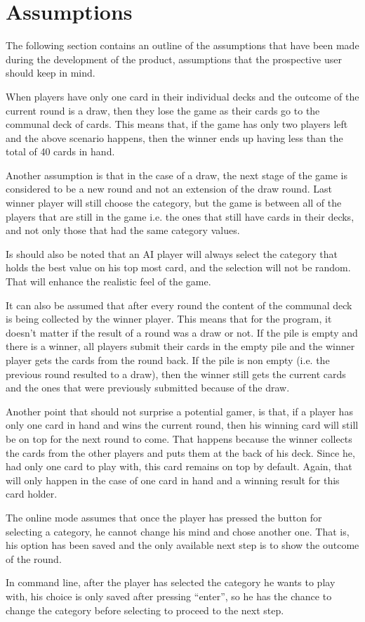 \newpage
\section{Assumptions}

The following section contains an outline of the assumptions that have been made during the development of the product, assumptions that the prospective user should keep in mind.

When players have only one card in their individual decks and the outcome of the current round is a draw, then they lose the game as their cards go to the communal deck of cards. This means that, if the game has only two players left and the above scenario happens, then the winner ends up having less than the total of 40 cards in hand.

Another assumption is that in the case of a draw, the next stage of the game is considered to be a new round and not an extension of the draw round. Last winner player will still choose the category, but the game is between all of the players that are still in the game i.e. the ones that still have cards in their decks, and not only those that had the same category values.

Is should also be noted that an AI player will always select the category that holds the best value on his top most card, and the selection will not be random. That will enhance the realistic feel of the game.

It can also be assumed that after every round the content of the communal deck is being collected by the winner player. This means that for the program, it doesn't matter if the result of a round was a draw or not. If the pile is empty and there is a winner, all players submit their cards in the empty pile and the winner player gets the cards from the round back. If the pile is non empty (i.e. the previous round resulted to a draw), then the winner still gets the current cards and the ones that were previously submitted because of the draw.

Another point that should not surprise a potential gamer, is that, if a player has only one card in hand and wins the current round, then his winning card will still be on top for the next round to come. That happens because the winner collects the cards from the other players and puts them at the back of his deck. Since he, had only one card to play with, this card remains on top by default. Again, that will only happen in the case of one card in hand and a winning result for this card holder. 

The online mode assumes that once the player has pressed the button for selecting a category, he cannot change his mind and chose another one. That is, his option has been saved and the only available next step is to show the outcome of the round.

In command line, after the player has selected the category he wants to play with, his choice is only saved after pressing ``enter'', so he has the chance to change the category before selecting to proceed to the next step.


